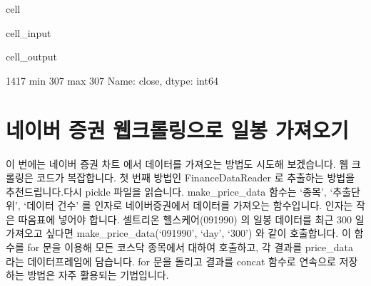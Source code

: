 \documentclass[letterpaper,10pt,english]{jupyterBook}
\begin{document}
\begin{sphinxuseclass}{cell}\begin{sphinxVerbatimInput}

\begin{sphinxuseclass}{cell_input}
\begin{sphinxVerbatim}[commandchars=\\\{\}]
\PYG{p}{[}\PYG{p}{]}
\PYG{p}{[}\PYG{p}{]}\PYG{p}{[}\PYG{p}{]}
\end{sphinxVerbatim}

\end{sphinxuseclass}\end{sphinxVerbatimInput}
\begin{sphinxVerbatimOutput}

\begin{sphinxuseclass}{cell_output}
\begin{sphinxVerbatim}[commandchars=\\\{\}]
1417
min    307
max    307
Name: close, dtype: int64
\end{sphinxVerbatim}

\end{sphinxuseclass}\end{sphinxVerbatimOutput}

\end{sphinxuseclass}



\section{네이버 증권 웹크롤링으로 일봉 가져오기}
\label{\detokenize{chapter4/4.4.1_Data_Collection:id1}}
\sphinxAtStartPar
이 번에는 네이버 증권 차트  에서 데이터를 가져오는 방법도 시도해 보겠습니다. 웹 크롤링은 코드가 복잡합니다. 첫 번째 방법인 FinanceDataReader 로 추출하는 방법을 추천드립니다.다시 pickle 파일을 읽습니다. make\_price\_data 함수는 ‘종목’, ‘추출단위’, ‘데이터 건수’ 를 인자로 네이버증권에서 데이터를 가져오는 함수입니다. 인자는 작은 따옴표에 넣어야 합니다. 셀트리온 헬스케어(091990) 의 일봉 데이터를 최근 300 일 가져오고 싶다면  make\_price\_data(‘091990’, ‘day’, ‘300’) 와 같이 호출합니다. 이 함수를 for 문을 이용해 모든 코스닥 종목에서 대하여 호출하고, 각 결과를 price\_data 라는 데이터프레임에 담습니다.
for 문을 돌리고 결과를 concat 함수로 연속으로 저장하는 방법은 자주 활용되는 기법입니다.
\end{document}
